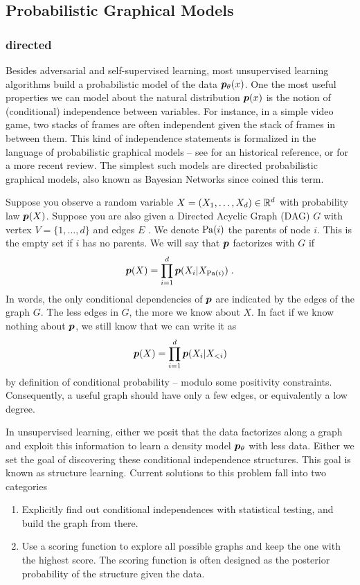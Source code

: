 \subsection{Probabilistic Graphical Models}
\subsubsection{directed} 
Besides adversarial and self-supervised learning, most unsupervised learning algorithms build a probabilistic model of the data $\bm{p}_{\theta}(x)$.
One the most useful properties we can model about the natural distribution $\bm{p}(x)$ is the notion of (conditional) independence between variables. For instance, in a simple video game, two stacks of frames are often independent given the stack of frames in between them. This kind of independence statements is formalized in the language of probabilistic graphical models -- see \citet{pearl1988probabilistic} for an historical reference, or  \citet{koller2009probabilistic} for a more recent review. The simplest such models are directed probabilistic graphical models, also known as Bayesian Networks since \citet{pearl1985bayesian} coined this term.

Suppose you observe a random variable $X=(X_1, \dots, X_d) \in \mathbb{R}^d$ with probability law $\bm{p}(X)$. Suppose you are also given a Directed Acyclic Graph (DAG) $G$ with vertex $V=\{1, \dots, d \}$ and edges $E$ . We denote $\operatorname{\mathrm{Pa}}(i)$ the parents of node $i$. This is the empty set if $i$ has no parents. We will say that $\bm{p}$ factorizes with $G$ if
\begin{align}
    \bm{p}(X) = \prod_{i=1}^d \bm{p}(X_i | X_{\operatorname{\mathrm{Pa}}(i)}) \; .
\end{align}
In words, the only conditional dependencies of $\bm{p}$ are indicated by the edges of the graph $G$. The less edges in $G$, the more we know about $X$. In fact if we know nothing about $\bm{p}$, we still know that we can write it as 
\begin{align}
    \bm{p}(X) = \prod_{i=1}^d \bm{p}(X_i | X_{<i} )\textbf{}
\end{align}
by definition of conditional probability -- modulo some positivity constraints. Consequently, a useful graph should have only a few edges, or equivalently a low degree.

In unsupervised learning, either we posit that the data factorizes along a graph and exploit this information to learn a density model $\bm{p}_{\theta}$ with less data. Either we set the goal of discovering these conditional independence structures. This goal is known as structure learning. Current solutions to this problem fall into two categories
\begin{enumerate}
    \item Explicitly find out conditional independences with statistical testing, and build the graph from there.
    \item Use a scoring function to explore all possible graphs and keep the one with the highest score. The scoring function is often designed as the posterior probability of the structure given the data.
\end{enumerate}

